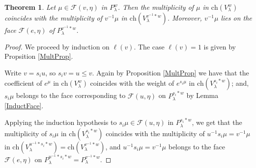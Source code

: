 \documentclass[12pt,reqno]{amsart}
\newtheorem{theorem}{Theorem}[section]
\theoremstyle{definition}
\begin{document}
\begin{theorem} \label{ConnectingTheorem}
Let $\mu \in \mathcal{F}(v, \eta)$ in $P_\lambda^w$. Then the multiplicity of $\mu$ in $\mathrm{ch}(V_\lambda^w)$ coincides with the multiplicity of $v^{-1}\mu$ in $\mathrm{ch}(V_\lambda^{v^{-1}*w})$. Moreover, $v^{-1}\mu$ lies on the face $\mathcal{F}(e, \eta)$ of $P_\lambda^{v^{-1} \ast w}$. 
\end{theorem}


\begin{proof}
We proceed by induction on $\ell(v)$. The case $\ell(v)=1$ is given by Propsition \ref{MultProp}.

Write $v = s_{i}u$, so $s_i v=u \le v$. Again by Proposition \ref{MultProp} we have that the coefficient of $e^\mu$ in $\mathrm{ch}(V_\lambda^w)$ coincides with the weight of $e^{s_i\mu}$ in $\mathrm{ch}(V_\lambda^{s_i*w})$; and, $s_i\mu$ belongs to the face corresponding to $\mathcal{F}(u, \eta)$ on $P_\lambda^{s_i*w}$ by Lemma \ref{InductFace}.

Applying the induction hypothesis to $s_i \mu \in \mathcal{F}(u, \eta)$ in $P_\lambda^{s_i \ast w}$, we get that the multiplicity of $s_i\mu$ in $\mathrm{ch}(V_\lambda^{s_i*w})$ coincides with the multiplicity of $u^{-1}s_i\mu = v^{-1} \mu$ in $\mathrm{ch}(V_\lambda^{u^{-1}*s_i*w})= \mathrm{ch}(V_\lambda^{v^{-1}\ast w})$, and $u^{-1}s_i\mu = v^{-1}\mu$ belongs to the face $\mathcal{F}(e, \eta)$ on $P_\lambda^{u^{-1}*s_i *w}=P_\lambda^{v^{-1} \ast w}$. 
\end{proof}

\end{document}
